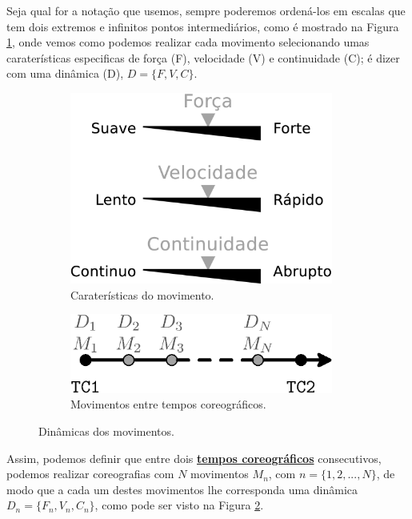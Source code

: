Seja qual for a notação que usemos, sempre poderemos ordená-los em escalas
que tem dois extremos e infinitos pontos intermediários,
como é mostrado na Figura \ref{fig:element:moviment},
onde vemos como podemos realizar cada movimento selecionando umas caraterísticas especificas de força (F), velocidade (V) e continuidade (C);
é dizer com uma dinâmica (D),  $D=\{F, V, C\}$.
\begin{figure}[!h]
\centering
    \begin{subfigure}[b]{0.45\textwidth}
    \centering
    \includegraphics[width=0.95\textwidth]{chapters/cap-musicalidade/dinamicas-elementos1.eps}
    \caption{Caraterísticas do movimento.}
    \label{fig:element:moviment}
    \end{subfigure}
    \hfill
    \begin{subfigure}[b]{0.5\textwidth}
    \centering
    \includegraphics[width=0.95\textwidth]{chapters/cap-musicalidade/dinamicas-elementos1b.eps}
    \caption{Movimentos entre tempos coreográficos.}
    \label{fig:coreografia:moviment}
    \end{subfigure}
\caption{Dinâmicas dos movimentos.}
\label{fig:geral:moviment}
\end{figure}

Assim, podemos definir que entre dois \hyperref[sec:TemposCoreograficos]{\textbf{tempos coreográficos}} consecutivos,
podemos realizar coreografias com $N$ movimentos $M_n$, com $n=\{1, 2, ..., N\}$, 
de modo que a cada um destes movimentos lhe corresponda uma dinâmica $D_n=\{F_n, V_n, C_n\}$,
como pode ser visto na Figura \ref{fig:coreografia:moviment}.


